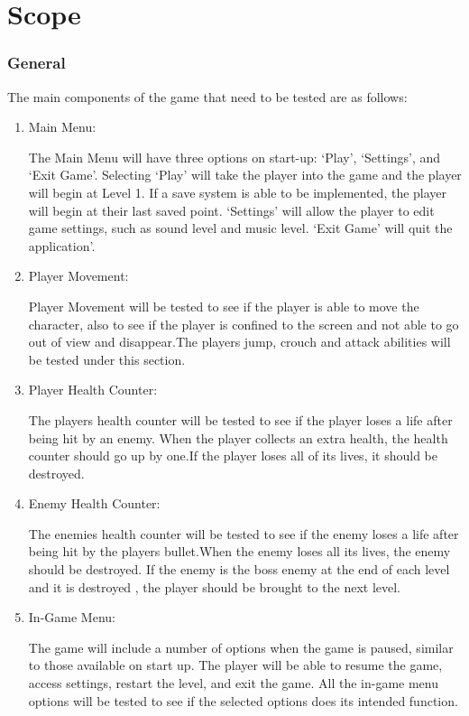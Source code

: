 \documentclass{article}
\begin{document}
\newpage

\section{Scope}
\subsubsection{General}
The main components of the game that need to be tested are as follows:
\begin{enumerate}
    \item Main Menu:
    
    The Main Menu will have three options on start-up: ‘Play’, ‘Settings’, and ‘Exit Game’.
    Selecting ‘Play’ will take the player into the game and the player will begin at Level 1.
    If a save system is able to be implemented, the player will begin at their last saved
    point. ‘Settings’ will allow the player to edit game settings, such as sound level and
    music level. ‘Exit Game’ will quit the application’.
    \item Player Movement:
    
    Player Movement will be tested to see if the player is able to move the character, also to see if the player is confined to the screen and not able to go out of view and disappear.The players jump, crouch and attack abilities will be tested under this section.
    \item Player Health Counter:
    
    The players health counter will be tested to see if the player loses a life after being hit by an enemy. When the player collects an extra health, the health counter should go up by one.If the player loses all of its lives, it should be destroyed.
    \item Enemy Health Counter:
    
    The enemies health counter will be tested to see if the enemy loses a life after being hit by the players bullet.When the enemy loses all its lives, the enemy should be destroyed. If the enemy is the boss enemy at the end of each level and it is destroyed , the player should be brought to the next level.
    \item In-Game Menu:
    
    The game will include a number of options when the game is paused, similar to those
    available on start up. The player will be able to resume the game, access settings,
    restart the level, and exit the game. All the in-game menu options will be tested to see if the selected options does its intended function.
    
\end{enumerate}
\end{document}
